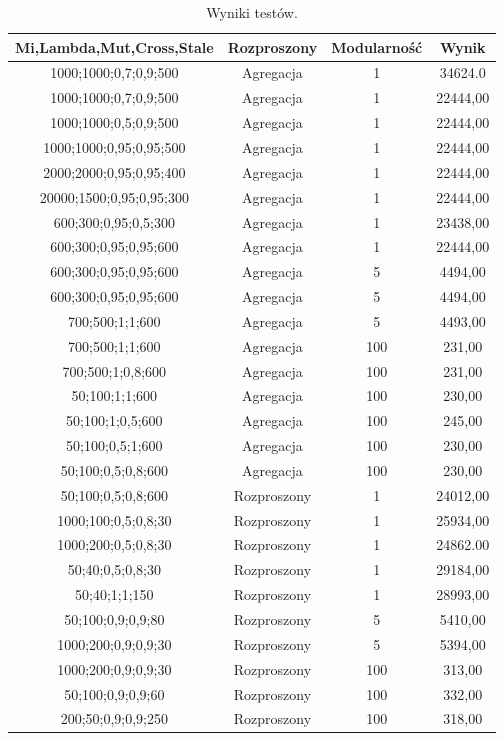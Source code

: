 \begin{table}[h!]
    \centering
    \begin{tabular}{||c c c c||} 
     \hline
     Mi,Lambda,Mut,Cross,Stale & Rozproszony & Modularność & Wynik \\ [0.5ex] 
     \hline\hline
     1000;1000;0,7;0,9;500 & Agregacja & 1 & 34624.0 \\
     1000;1000;0,7;0,9;500 & Agregacja & 1 & 22444,00 \\
     1000;1000;0,5;0,9;500 & Agregacja & 1 & 22444,00 \\
     1000;1000;0,95;0,95;500 & Agregacja & 1 & 22444,00 \\
     2000;2000;0,95;0,95;400 & Agregacja & 1 & 22444,00 \\
     20000;1500;0,95;0,95;300 & Agregacja & 1 & 22444,00 \\
     600;300;0,95;0,5;300 & Agregacja & 1 & 23438,00 \\
     600;300;0,95;0,95;600 & Agregacja & 1 & 22444,00 \\
     \hline
     600;300;0,95;0,95;600 & Agregacja & 5 & 4494,00 \\
     600;300;0,95;0,95;600 & Agregacja & 5 & 4494,00 \\
     700;500;1;1;600 & Agregacja & 5 & 4493,00 \\
     \hline
     700;500;1;1;600 & Agregacja & 100 & 231,00 \\
     700;500;1;0,8;600 & Agregacja & 100 & 231,00 \\
     50;100;1;1;600 & Agregacja & 100 & 230,00 \\
     50;100;1;0,5;600 & Agregacja & 100 & 245,00 \\
     50;100;0,5;1;600 & Agregacja & 100 & 230,00 \\
     50;100;0,5;0,8;600 & Agregacja & 100 & 230,00 \\
     \hline
     50;100;0,5;0,8;600 & Rozproszony & 1 & 24012,00 \\
     1000;100;0,5;0,8;30 & Rozproszony & 1 & 25934,00 \\
     1000;200;0,5;0,8;30 & Rozproszony & 1 & 24862.00 \\
     50;40;0,5;0,8;30 & Rozproszony & 1 & 29184,00 \\
     50;40;1;1;150 & Rozproszony & 1 & 28993,00 \\
     \hline
     50;100;0,9;0,9;80 & Rozproszony & 5 & 5410,00 \\
     1000;200;0,9;0,9;30 & Rozproszony & 5 & 5394,00 \\
     \hline
     1000;200;0,9;0,9;30 & Rozproszony & 100 & 313,00 \\
     50;100;0,9;0,9;60 & Rozproszony & 100 & 332,00 \\
     200;50;0,9;0,9;250 & Rozproszony & 100 & 318,00 \\   
     \hline
    \end{tabular}
    \caption{Wyniki testów.}
    \label{table:results}
\end{table}